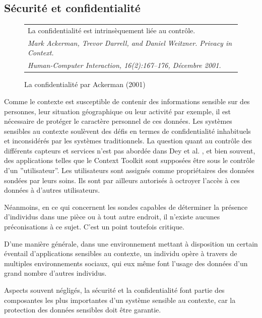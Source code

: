 \subsection{Sécurité et confidentialité}

\begin{figure}[H]
    \centering
    \begin{tabular}{l}
        La confidentialité est intrinsèquement liée au contrôle.
        \cite{ackerman_privacy_2001} \\
        \em \footnotesize Mark Ackerman, Trevor Darrell, and Daniel Weitzner. 
        Privacy in Context. \\
        \em \footnotesize Human-Computer Interaction, 16(2):167–176, Décembre
        2001. \\
    \end{tabular}
    \caption{La confidentialité par Ackerman (2001)}
    \label{fig:quote}
\end{figure}


Comme le contexte est susceptible de contenir des informations sensible sur des
personnes, leur situation géographique ou leur activité par exemple, il est
nécessaire de protéger le caractère personnel de ces données. Les systèmes
sensibles au contexte soulèvent des défis en termes de confidentialité
inhabituels et inconsidérés par les systèmes traditionnels. La question quant au
contrôle des différents capteurs et services n'est pas abordée dans Dey et al.
\cite{dey_conceptual_2001}, et bien souvent, des applications telles que le
Context Toolkit sont supposées être sous le contrôle d'un ''utilisateur''. Les
utilisateurs sont assignés comme propriétaires des données sondées par leurs
soins. Ils sont par ailleurs autorisés à octroyer l'accès à ces données à
d'autres utilisateurs.

Néanmoins, en ce qui concernent les sondes capables de déterminer la présence
d'individus dans une pièce ou à tout autre endroit, il n'existe aucunes
préconisations à ce sujet. C'est un point toutefois critique.

D'une manière générale, dans une environnement mettant à disposition un certain
éventail d'applications sensibles au contexte, un individu opère à travers de
multiples environnements sociaux, qui eux même font l'usage des données d'un
grand nombre d'autres individus.

Aspects souvent négligés, la sécurité et la confidentialité font partie des
composantes les plus importantes d'un système sensible au contexte, car la
protection des données sensibles doit être garantie.

